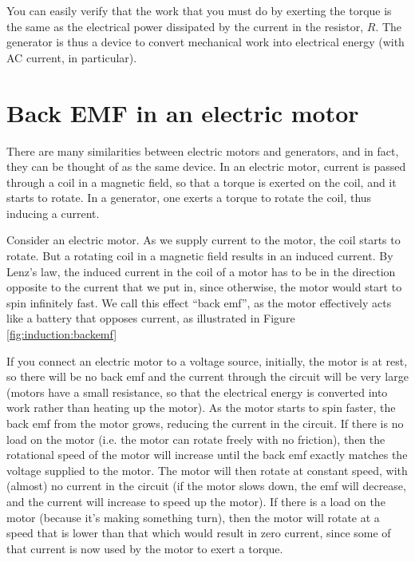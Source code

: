 You can easily verify that the work that you must do by exerting the torque is the same as the electrical power dissipated by the current in the resistor, $R$. The generator is thus a device to convert mechanical work into electrical energy (with AC current, in particular). 

\section{Back EMF in an electric motor}
There are many similarities between electric motors and generators, and in fact, they can be thought of as the same device. In an electric motor, current is passed through a coil in a magnetic field, so that a torque is exerted on the coil, and it starts to rotate. In a generator, one exerts a torque to rotate the coil, thus inducing a current. 

Consider an electric motor. As we supply current to the motor, the coil starts to rotate. But a rotating coil in a magnetic field results in an induced current. By Lenz's law, the induced current in the coil of a motor has to be in the direction opposite to the current that we put in, since otherwise, the motor would start to spin infinitely fast. We call this effect ``back emf'', as the motor effectively acts like a battery that opposes current, as illustrated in Figure \ref{fig:induction:backemf}


If you connect an electric motor to a voltage source, initially, the motor is at rest, so there will be no back emf and the current through the circuit will be very large (motors have a small resistance, so that the electrical energy is converted into work rather than heating up the motor). As the motor starts to spin faster, the back emf from the motor grows, reducing the current in the circuit. If there is no load on the motor (i.e. the motor can rotate freely with no friction), then the rotational speed of the motor will increase until the back emf exactly matches the voltage supplied to the motor. The motor will then rotate at constant speed, with (almost) no current in the circuit (if the motor slows down, the emf will decrease, and the current will increase to speed up the motor). If there is a load on the motor (because it's making something turn), then the motor will rotate at a speed that is lower than that which would result in zero current, since some of that current is now used by the motor to exert a torque.

